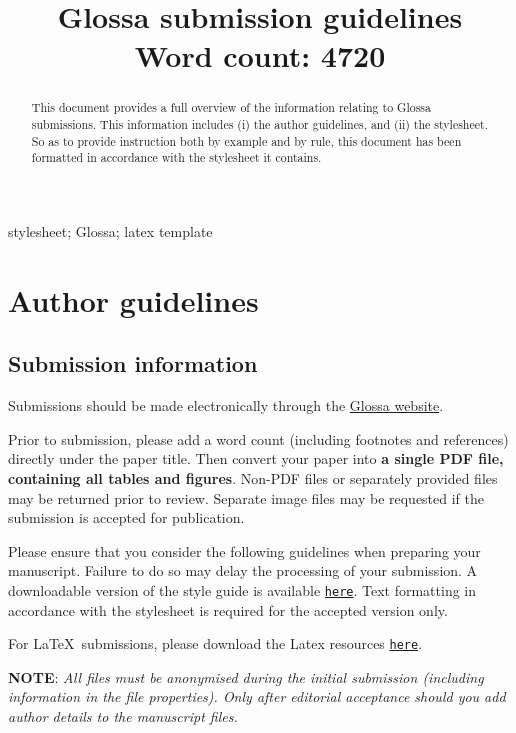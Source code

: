 \documentclass[charis,linguex,biblatex]{glossa}
\title[Glossa guidelines]{Glossa submission guidelines\\ \bigskip \large Word count: 4720}
\author[Paul \& Vanden Wyngaerd]%
{%
  \spauthor{Waltraud Paul\\ 
  \institute{CRLAO, CNRS-EHESS-INALCO}\\
  \small{%
  waltraud.paul@ehess.fr}
  }
  \AND
  \spauthor{Guido Vanden Wyngaerd \\
  \institute{KU Leuven}\\
  \small{%
  guido.vandenwyngaerd@kuleuven.be}
  }%
}
\begin{document}
\sffamily
\maketitle


\begin{abstract}
This document provides a full overview of the information relating to Glossa submissions. This information includes (i) the author guidelines, and (ii) the stylesheet. So as to provide instruction both by example and by rule, this document has been formatted in accordance with the stylesheet it contains.
\end{abstract}

\begin{keywords}
  stylesheet; Glossa; latex template
\end{keywords}

\rmfamily


\section{Author guidelines}
\subsection{Submission information}

Submissions should be made electronically through the \href{https://www.glossa-journal.org}{Glossa website}. 

Prior to submission, please add a word count (including footnotes and references) directly under the paper title. Then convert your paper into \textbf{a single PDF file, containing all tables and figures}. Non-PDF files or separately provided files may be returned prior to review. Separate image files may be requested if the submission is accepted for publication.

Please ensure that you consider the following guidelines when preparing your manuscript. Failure to do so may delay the processing of your submission. A downloadable version of the style guide is available \href{https://github.com/guidovw/Glossalatex/blob/master/glossa-template.pdf}{\texttt{here}}. Text formatting in accordance with  the stylesheet is required for the accepted version only.


For \LaTeX\ submissions, please download the Latex resources \href{https://github.com/guidovw/Glossalatex}{\texttt{here}}.

\textbf{NOTE}: \emph{All files must be anonymised during the initial submission (including information in the file properties). Only after editorial acceptance should you add author details to the manuscript files.} 
\end{document}
